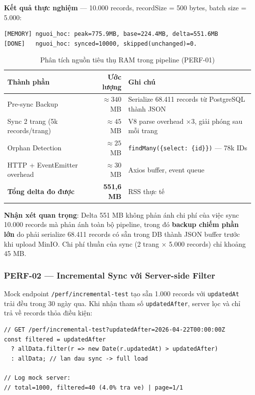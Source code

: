 \textbf{Kết quả thực nghiệm} — 10.000 records, recordSize = 500 bytes,
batch size = 5.000:

\begin{verbatim}
[MEMORY] nguoi_hoc: peak=775.9MB, base=224.4MB, delta=551.6MB
[DONE]   nguoi_hoc: synced=10000, skipped(unchanged)=0.
\end{verbatim}

\begin{table}[H]
\centering
\caption{Phân tích nguồn tiêu thụ RAM trong pipeline (PERF-01)}
\label{tab:ram-breakdown}
\begin{tabularx}{\textwidth}{lrX}
\toprule
\textbf{Thành phần} & \textbf{Ước lượng} & \textbf{Ghi chú} \\
\midrule
Pre-sync Backup
  & $\approx 340$ MB
  & Serialize 68.411 records từ PostgreSQL thành JSON \\
Sync 2 trang (5k records/trang)
  & $\approx 45$ MB
  & V8 parse overhead $\times 3$, giải phóng sau mỗi trang \\
Orphan Detection
  & $\approx 25$ MB
  & \texttt{findMany(\{select: \{id\}\})} — 78k IDs \\
HTTP + EventEmitter overhead
  & $\approx 30$ MB
  & Axios buffer, event queue \\
\midrule
\textbf{Tổng delta đo được} & \textbf{551,6 MB} & RSS thực tế \\
\bottomrule
\end{tabularx}
\end{table}

\textbf{Nhận xét quan trọng}: Delta 551 MB không phản ánh chi phí
của việc sync 10.000 records mà phản ánh toàn bộ pipeline, trong đó
\textbf{backup chiếm phần lớn} do phải serialize 68.411 records có
sẵn trong DB thành JSON buffer trước khi upload MinIO. Chi phí
thuần của sync (2 trang × 5.000 records) chỉ khoảng 45 MB.

\subsubsection{PERF-02 — Incremental Sync với Server-side Filter}

Mock endpoint \texttt{/perf/incremental-test} tạo sẵn 1.000 records
với \texttt{updatedAt} trải đều trong 30 ngày qua. Khi nhận tham số
\texttt{updatedAfter}, server lọc và chỉ trả về records thỏa điều kiện:

\begin{lstlisting}[caption={PERF-02: Server-side filter theo \texttt{updatedAfter}},
  label={lst:perf02-mock}]
// GET /perf/incremental-test?updatedAfter=2026-04-22T00:00:00Z
const filtered = updatedAfter
  ? allData.filter(r => new Date(r.updatedAt) > updatedAfter)
  : allData; // lan dau sync -> full load

// Log mock server:
// total=1000, filtered=40 (4.0% tra ve) | page=1/1
\end{lstlisting}

